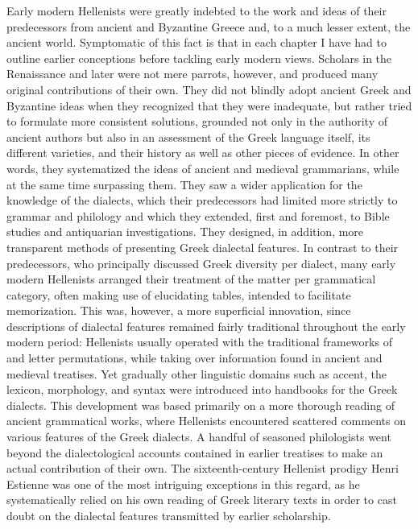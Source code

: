 Early modern Hellenists were greatly indebted to the work and ideas of their predecessors from ancient and Byzantine Greece and, to a much lesser extent, the ancient  world. Symptomatic of this fact is that in each chapter I have had to outline earlier conceptions before tackling early modern views. Scholars in the Renaissance and later were not mere parrots, however, and produced many original contributions of their own. They did not blindly adopt ancient Greek and Byzantine ideas when they recognized that they were inadequate, but rather tried to formulate more consistent solutions, grounded not only in the authority of ancient authors but also in an assessment of the Greek language itself, its different varieties, and their history as well as other pieces of evidence. In other words, they systematized the ideas of ancient and medieval grammarians, while at the same time surpassing them. They saw a wider application for the knowledge of the dialects, which their predecessors had limited more strictly to grammar and philology and which they extended, first and foremost, to Bible studies and antiquarian investigations. They designed, in addition, more transparent methods of presenting Greek dialectal features. In contrast to their predecessors, who principally discussed Greek diversity per dialect, many early modern Hellenists arranged their treatment of the matter per grammatical category, often making use of elucidating tables, intended to facilitate memorization. This was, however, a more superficial innovation, since descriptions of dialectal features remained fairly traditional throughout the early modern period: Hellenists usually operated with the traditional frameworks of  and letter permutations, while taking over information found in ancient and medieval treatises. Yet gradually other linguistic domains such as accent, the lexicon, morphology, and syntax were introduced into handbooks for the Greek dialects. This development was based primarily on a more thorough reading of ancient grammatical works, where Hellenists encountered scattered comments on various features of the Greek dialects. A handful of seasoned philologists went beyond the dialectological accounts contained in earlier treatises to make an actual contribution of their own. The sixteenth-century Hellenist prodigy Henri Estienne was one of the most intriguing exceptions in this regard, as he systematically relied on his own reading of Greek literary texts in order to cast doubt on the dialectal features transmitted by earlier scholarship.

